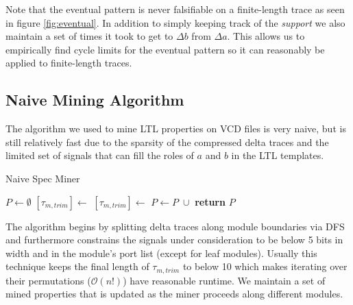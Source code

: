 \documentclass[acmlarge,11pt]{acmart}
\begin{document}
Note that the eventual pattern is never falsifiable on a finite-length trace as seen in figure \ref{fig:eventual}.
In addition to simply keeping track of the \textit{support} we also maintain a set of times it took to get to $\Delta b$ from $\Delta a$.
This allows us to empirically find cycle limits for the eventual pattern so it can reasonably be applied to finite-length traces.

\subsection{Naive Mining Algorithm}
The algorithm we used to mine LTL properties on VCD files is very naive, but is still relatively fast due to the sparsity of the compressed delta traces and the limited set of signals that can fill the roles of $a$ and $b$ in the LTL templates.
\begin{algorithm}[H]
  \caption{Naive Spec Miner}
  \begin{algorithmic}[1]
     
      \State $P \gets \emptyset$
       
        \State $[\tau_{m,trim}] \gets$  
         
          \State $[\tau_{m,trim}] \gets$ 
        \EndIf
            \State $P \gets P \; \cup$ 
          \EndFor
        \EndFor
      \EndFor
      \State \textbf{return} $P$
    \EndProcedure
  \end{algorithmic}
\end{algorithm}

The algorithm begins by splitting delta traces along module boundaries via DFS and furthermore constrains the signals under consideration to be below 5 bits in width and in the module's port list (except for leaf modules).
Usually this technique keeps the final length of $\tau_{m,trim}$ to below 10 which makes iterating over their permutations ($\mathcal{O}(n!)$) have reasonable runtime.
We maintain a set of mined properties that is updated as the miner proceeds along different modules.
\end{document}

